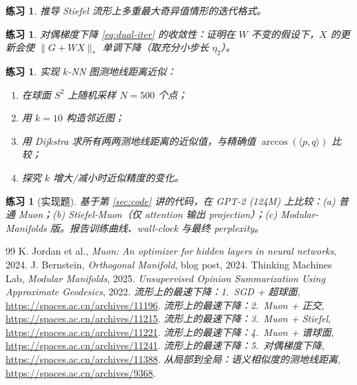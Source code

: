 \documentclass[11pt,a4paper]{article}
\theoremstyle{mythm}
\theoremstyle{mydef}
\newtheorem{exercise}[theorem]{练习}
\newcommand{\inner}[2]{\langle #1, #2 \rangle}
\newcommand{\nuc}{\ast}
\begin{document}
\begin{exercise}
推导 Stiefel 流形上多重最大奇异值情形的迭代格式。
\end{exercise}

\begin{exercise}\label{ex:dual-conv}
对偶梯度下降 \eqref{eq:dual-iter} 的收敛性：证明在 $W$ 不变的假设下，$X$ 的更新会使 $\|G+WX\|_\nuc$ 单调下降（取充分小步长 $\eta_2$）。
\end{exercise}

\begin{exercise}\label{ex:geo-impl}
实现 $k$-NN 图测地线距离近似：
\begin{enumerate}[leftmargin=2em]
\item 在球面 $S^2$ 上随机采样 $N=500$ 个点；
\item 用 $k=10$ 构造邻近图；
\item 用 Dijkstra 求所有两两测地线距离的近似值，与精确值 $\arccos(\inner{p}{q})$ 比较；
\item 探究 $k$ 增大/减小时近似精度的变化。
\end{enumerate}
\end{exercise}

\begin{exercise}[实现题]
基于第 \ref{sec:code} 讲的代码，在 GPT-2 (124M) 上比较：(a) 普通 Muon；(b) Stiefel-Muon（仅 attention 输出 projection）；(c) Modular-Manifolds 版。报告训练曲线、wall-clock 与最终 perplexity。
\end{exercise}

\begin{thebibliography}{99}
 K. Jordan et al., \emph{Muon: An optimizer for hidden layers in neural networks}, 2024.
 J. Bernstein, \emph{Orthogonal Manifold}, blog post, 2024.
 Thinking Machines Lab, \emph{Modular Manifolds}, 2025.
 \emph{Unsupervised Opinion Summarization Using Approximate Geodesics}, 2022.
 \emph{流形上的最速下降：1.\ SGD + 超球面}, \url{https://spaces.ac.cn/archives/11196}.
 \emph{流形上的最速下降：2.\ Muon + 正交}, \url{https://spaces.ac.cn/archives/11215}.
 \emph{流形上的最速下降：3.\ Muon + Stiefel}, \url{https://spaces.ac.cn/archives/11221}.
 \emph{流形上的最速下降：4.\ Muon + 谱球面}, \url{https://spaces.ac.cn/archives/11241}.
 \emph{流形上的最速下降：5.\ 对偶梯度下降}, \url{https://spaces.ac.cn/archives/11388}.
 \emph{从局部到全局：语义相似度的测地线距离}, \url{https://spaces.ac.cn/archives/9368}.
\end{thebibliography}
\end{document}
